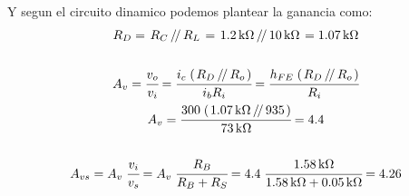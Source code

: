 \documentclass[a4paper,12pt]{article}
\newcommand{\parallelTwo}[2]{\left.#1\,\middle/\!\middle/\,#2\right.}
\newcommand{\mR}[1]{\SI{#1}{\kilo\ohm}}
\begin{document}
    Y segun el circuito dinamico podemos plantear la ganancia como:
    \begin{gather*}
        R_D = \parallelTwo{R_C}{R_L} = \parallelTwo{\mR{1.2}}{\mR{10}} = \mR{1.07}
        \\ \\
        A_v = \cfrac{v_o}{v_i} = \cfrac{ i_c \; (\parallelTwo{R_D}{R_o}) } { i_b R_i } 
            = \cfrac{ h_{FE} \; (\parallelTwo{R_D}{R_o}) } { R_i } \\
        A_v = \cfrac{ 300 \; (\parallelTwo{\mR{1.07}}{935}) } { \mR{73} } = 4.4
        \\ \\
        A_{vs} = A_v \; \cfrac{v_i}{v_s} = A_v \; \cfrac{R_B}{R_B + R_S} = 4.4 \; \cfrac{\mR{1.58}}{\mR{1.58} + \mR{0.05}} = 4.26
    \end{gather*}


\newpage
\end{document}
